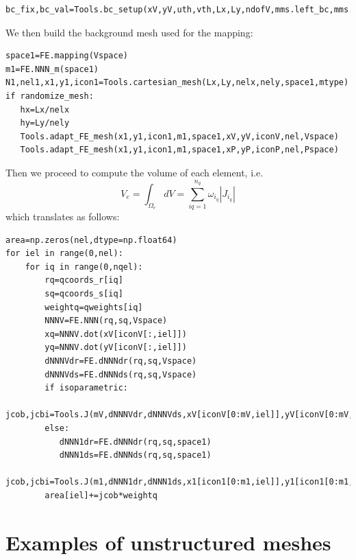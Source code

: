 \begin{lstlisting}
bc_fix,bc_val=Tools.bc_setup(xV,yV,uth,vth,Lx,Ly,ndofV,mms.left_bc,mms.right_bc,mms.bottom_bc,mms.top_bc)
\end{lstlisting}

We then build the background mesh used for the mapping:
\begin{lstlisting}
space1=FE.mapping(Vspace)
m1=FE.NNN_m(space1)
N1,nel1,x1,y1,icon1=Tools.cartesian_mesh(Lx,Ly,nelx,nely,space1,mtype)
if randomize_mesh:
   hx=Lx/nelx
   hy=Ly/nely
   Tools.adapt_FE_mesh(x1,y1,icon1,m1,space1,xV,yV,iconV,nel,Vspace)
   Tools.adapt_FE_mesh(x1,y1,icon1,m1,space1,xP,yP,iconP,nel,Pspace)
\end{lstlisting}




Then we proceed to compute the volume of each element, i.e. 
\[
V_e = \int_{\Omega_e} dV = \sum_{iq=1}^{n_q} \omega_{i_q} |J_{i_q}|
\]
which translates as follows: 
\begin{lstlisting}
area=np.zeros(nel,dtype=np.float64) 
for iel in range(0,nel):
    for iq in range(0,nqel):
        rq=qcoords_r[iq]
        sq=qcoords_s[iq]
        weightq=qweights[iq]
        NNNV=FE.NNN(rq,sq,Vspace)
        xq=NNNV.dot(xV[iconV[:,iel]]) 
        yq=NNNV.dot(yV[iconV[:,iel]]) 
        dNNNVdr=FE.dNNNdr(rq,sq,Vspace)
        dNNNVds=FE.dNNNds(rq,sq,Vspace)
        if isoparametric:
           jcob,jcbi=Tools.J(mV,dNNNVdr,dNNNVds,xV[iconV[0:mV,iel]],yV[iconV[0:mV,iel]])
        else:
           dNNN1dr=FE.dNNNdr(rq,sq,space1)
           dNNN1ds=FE.dNNNds(rq,sq,space1)
           jcob,jcbi=Tools.J(m1,dNNN1dr,dNNN1ds,x1[icon1[0:m1,iel]],y1[icon1[0:m1,iel]])
        area[iel]+=jcob*weightq
\end{lstlisting}

\newpage
\section*{Examples of unstructured meshes}

